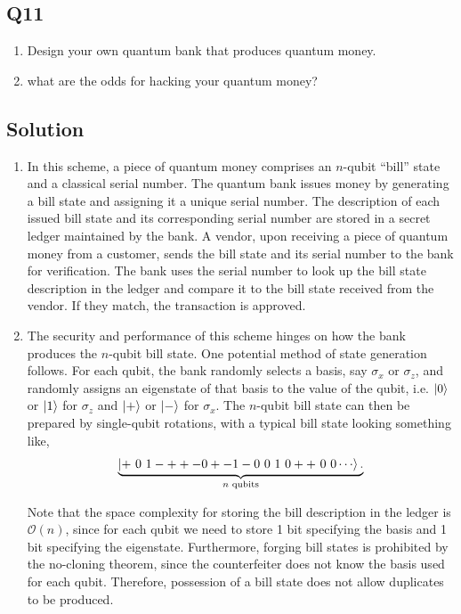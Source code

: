 \documentclass[12pt]{article}
\begin{document}
\begin{appendices}
\begin{enumerate}[label=\alph*)]
\end{enumerate}



\subsection*{Q11}
\begin{enumerate}[label=\alph*)]
    \item Design your own quantum bank that produces quantum money.
    \item what are the odds for hacking your quantum money?
\end{enumerate}

\subsection*{Solution}



\begin{enumerate}[label=\alph*)]
    \item In this scheme, a piece of quantum money comprises an $n$-qubit ``bill'' state and a classical serial number. The quantum bank issues money by generating a bill state and assigning it a unique serial number. The description of each issued bill state and its corresponding serial number are stored in a secret ledger maintained by the bank. A vendor, upon receiving a piece of quantum money from a customer, sends the bill state and its serial number to the bank for verification. The bank uses the serial number to look up the bill state description in the ledger and compare it to the bill state received from the vendor. If they match, the transaction is approved.
    
    \item The security and performance of this scheme hinges on how the bank produces the $n$-qubit bill state. One potential method of state generation follows. For each qubit, the bank randomly selects a basis, say $\sigma_x$ or $\sigma_z$, and randomly assigns an eigenstate of that basis to the value of the qubit, i.e. $\ket{0}$ or $\ket{1}$ for $\sigma_z$ and $\ket{+}$ or $\ket{-}$ for $\sigma_x$. The $n$-qubit bill state can then be prepared by single-qubit rotations, with a typical bill state looking something like,
    \[\underbrace{
        \ket{+\ 0\ 1 - + + - 0 + - 1 - 0\ 0\ 1\ 0 + +\ 0\ 0\cdots}.
    }_\text{$n$ qubits}\]
    
    Note that the space complexity for storing the bill description in the ledger is $\mathcal{O}(n)$, since for each qubit we need to store 1 bit specifying the basis and 1 bit specifying the eigenstate. Furthermore, forging bill states is prohibited by the no-cloning theorem, since the counterfeiter does not know the basis used for each qubit. Therefore, possession of a bill state does not allow duplicates to be produced.
    

\end{enumerate}
\end{appendices}
\end{document}
